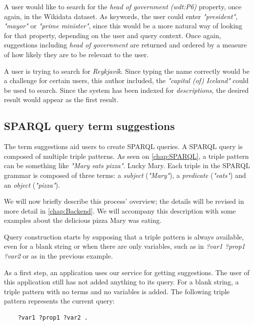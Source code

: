 \begin{example}
A user would like to search for the \textit{head of government (wdt:P6)}  property, once again, in the Wikidata dataset. 
As keywords, the user could enter \textit{"president"}, \textit{"mayor"} or \textit{"prime minister"}, since this would be a more natural way of looking for that property, depending on the user and query context. Once again, suggestions including \textit{head of government} are returned and ordered by a measure of how likely they are to be relevant to the user.
\end{example}

\begin{example}
A user is trying to search for \textit{Reykjavík}. 
Since typing the name correctly would be a challenge for certain users, this author included, the \textit{"capital (of) Iceland"} could be used to search. 
Since the system has been indexed for \textit{descriptions}, the desired result would appear as the first result. 

\subsection{SPARQL query term suggestions}

The term suggestions aid users to create SPARQL queries. 
A SPARQL query is composed of multiple triple patterns.
As seen on \autoref{chap:SPARQL}, a triple pattern can be something like \textit{"Mary eats pizza"}. 
Lucky Mary. 
Each triple in the SPARQL grammar is composed of three terms: 
a \textit{subject} (\textit{"Mary"}), 
a \textit{predicate} (\textit{"eats"}) 
and an \textit{object} (\textit{"pizza"}). 

We will now briefly describe this process' overview; the details will be revised in more detail in \autoref{chap:Backend}. 
We will accompany this description with some examples about the delicious pizza Mary was eating.

Query construction starts by supposing that a triple pattern is always available, even for a blank string or when there are only variables, such as in \textit{?var1 ?prop1 ?var2} or as in the previous example.

As a first step, an application uses our service for getting suggestions. 
The user of this application still has not added anything to its query. 
For a blank string, a triple pattern with no terms and no variables is added. 
The following triple pattern represents the current query:

\begin{verbatim}
    ?var1 ?prop1 ?var2 .
\end{verbatim}


\end{example}
